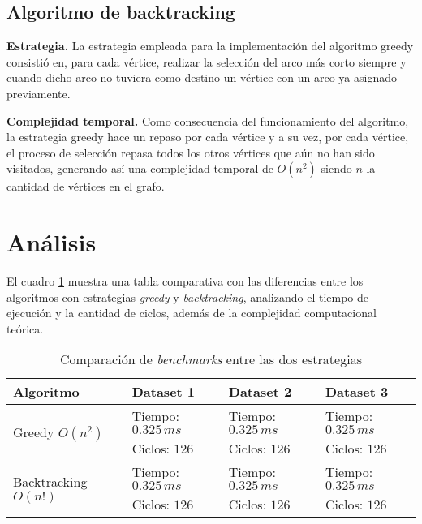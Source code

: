 \documentclass[10 pt, A4paper]{article}
\begin{document}
	\subsection*{Algoritmo de backtracking}
	\textbf{Estrategia.} La estrategia empleada para la implementación del algoritmo greedy consistió en, para cada vértice, realizar la selección del arco más corto siempre y cuando dicho arco no tuviera como destino un vértice con un arco ya asignado previamente.
	
	\noindent\textbf{Complejidad temporal.} Como consecuencia del funcionamiento del algoritmo, la estrategia greedy hace un repaso por cada vértice y a su vez, por cada vértice, el proceso de selección repasa todos los otros vértices que aún no han sido visitados, generando así una complejidad temporal de $O(n^2)$ siendo $n$ la cantidad de vértices en el grafo.
	
	\section*{Análisis}
	El cuadro \ref{table} muestra una tabla comparativa con las diferencias entre los algoritmos con estrategias \textit{greedy} y \textit{backtracking}, analizando el tiempo de ejecución y la cantidad de ciclos, además de la complejidad computacional teórica.
	
	\begin{table}[h!]
		\centering
		\begin{tabular}{|p{4cm} | p{3cm} | p{3cm} | p{3cm}|}
			\hline
			Algoritmo & Dataset 1 & Dataset 2 & Dataset 3 \\
			\hline
			\multirow{2}{1em}{Greedy $O(n^2)$} & Tiempo: $0.325\,ms$ & Tiempo: $0.325\,ms$& Tiempo: $0.325\,ms$ \\ & Ciclos: $126$ & Ciclos: $126$ & Ciclos: $126$ \\
			\hline
			\multirow{2}{1em}{Backtracking $O(n!)$} & Tiempo: $0.325\,ms$& Tiempo: $0.325\,ms$& Tiempo: $0.325\,ms$\\ & Ciclos: $126$ & Ciclos: $126$ & Ciclos: $126$ \\
			\hline
		\end{tabular}
		\caption{Comparación de \textit{benchmarks} entre las dos estrategias}
		\label{table}
	\end{table}
	
\end{document}
